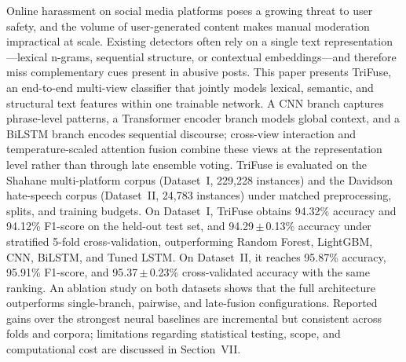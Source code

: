 Online harassment on social media platforms poses a growing threat to user safety, and the volume of user-generated content makes manual moderation impractical at scale. Existing detectors often rely on a single text representation---lexical n-grams, sequential structure, or contextual embeddings---and therefore miss complementary cues present in abusive posts. This paper presents TriFuse, an end-to-end multi-view classifier that jointly models lexical, semantic, and structural text features within one trainable network. A CNN branch captures phrase-level patterns, a Transformer encoder branch models global context, and a BiLSTM branch encodes sequential discourse; cross-view interaction and temperature-scaled attention fusion combine these views at the representation level rather than through late ensemble voting. TriFuse is evaluated on the Shahane multi-platform corpus (Dataset~I, 229{,}228 instances) and the Davidson hate-speech corpus (Dataset~II, 24{,}783 instances) under matched preprocessing, splits, and training budgets. On Dataset~I, TriFuse obtains 94.32\% accuracy and 94.12\% F1-score on the held-out test set, and 94.29\,$\pm$\,0.13\% accuracy under stratified 5-fold cross-validation, outperforming Random Forest, LightGBM, CNN, BiLSTM, and Tuned LSTM. On Dataset~II, it reaches 95.87\% accuracy, 95.91\% F1-score, and 95.37\,$\pm$\,0.23\% cross-validated accuracy with the same ranking. An ablation study on both datasets shows that the full architecture outperforms single-branch, pairwise, and late-fusion configurations. Reported gains over the strongest neural baselines are incremental but consistent across folds and corpora; limitations regarding statistical testing, scope, and computational cost are discussed in Section~VII.
